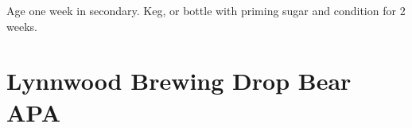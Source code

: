 \documentclass[10pt,oneside]{scrbook}
\begin{document}

\begin{methodandtiming}
 
\begin{mashsteps}
\end{mashsteps}

\begin{fermentationsteps}
\end{fermentationsteps}

\begin{directions}
Age one week in secondary. Keg, or bottle with  priming sugar and condition
for 2 weeks.
\end{directions}

\end{methodandtiming}

\pagebreak

\begin{ingredientsblock}

\begin{malts}

\end{malts}

\begin{hops}

\end{hops}

\begin{yeasts}
\end{yeasts}

\end{ingredientsblock}

\chapter*{Lynnwood Brewing Drop Bear APA}
\end{document}
